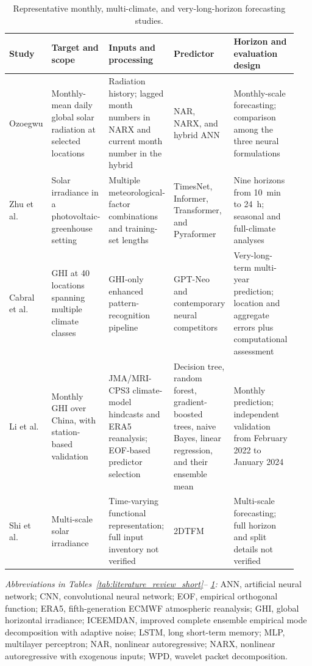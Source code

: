 \begin{table}[!htbp]
\centering
\caption{Representative monthly, multi-climate, and very-long-horizon
forecasting studies.}
\label{tab:literature_review_long}
\scriptsize
\setlength{\tabcolsep}{2.5pt}
\renewcommand{\arraystretch}{1.12}
\begin{tabular}{@{}p{0.11\linewidth}p{0.18\linewidth}p{0.22\linewidth}p{0.18\linewidth}p{0.25\linewidth}@{}}
\toprule
\textbf{Study} & \textbf{Target and scope} & \textbf{Inputs and processing} &
\textbf{Predictor} & \textbf{Horizon and evaluation design} \\
\midrule
Ozoegwu \cite{ozoegwu2019} &
Monthly-mean daily global solar radiation at selected locations &
Radiation history; lagged month numbers in NARX and current month number in the hybrid &
NAR, NARX, and hybrid ANN &
Monthly-scale forecasting; comparison among the three neural formulations \\

Zhu et al.\ \cite{zhu2024} &
Solar irradiance in a photovoltaic-greenhouse setting &
Multiple meteorological-factor combinations and training-set lengths &
TimesNet, Informer, Transformer, and Pyraformer &
Nine horizons from 10~min to 24~h; seasonal and full-climate analyses \\

Cabral et al.\ \cite{cabral2026} &
GHI at 40 locations spanning multiple climate classes &
GHI-only enhanced pattern-recognition pipeline &
GPT-Neo and contemporary neural competitors &
Very-long-term multi-year prediction; location and aggregate errors plus computational assessment \\

Li et al.\ \cite{li2026monthly} &
Monthly GHI over China, with station-based validation &
JMA/MRI-CPS3 climate-model hindcasts and ERA5 reanalysis; EOF-based predictor selection &
Decision tree, random forest, gradient-boosted trees, naive Bayes, linear regression, and their ensemble mean &
Monthly prediction; independent validation from February 2022 to January 2024 \\

Shi et al.\ \cite{shi2026multiscale} &
Multi-scale solar irradiance &
Time-varying functional representation; full input inventory not verified &
2DTFM &
Multi-scale forecasting; full horizon and split details not verified \\
\bottomrule
\end{tabular}
\par\medskip
\begin{minipage}{0.96\linewidth}
\scriptsize
\textit{Abbreviations in Tables~\ref{tab:literature_review_short}--%
\ref{tab:literature_review_long}:} ANN, artificial neural network; CNN,
convolutional neural network; EOF, empirical orthogonal function; ERA5,
fifth-generation ECMWF atmospheric reanalysis; GHI, global horizontal irradiance; ICEEMDAN,
improved complete ensemble empirical mode decomposition with adaptive noise;
LSTM, long short-term memory; MLP, multilayer perceptron; NAR, nonlinear
autoregressive; NARX, nonlinear autoregressive with exogenous inputs; WPD,
wavelet packet decomposition.
\end{minipage}
\end{table}
